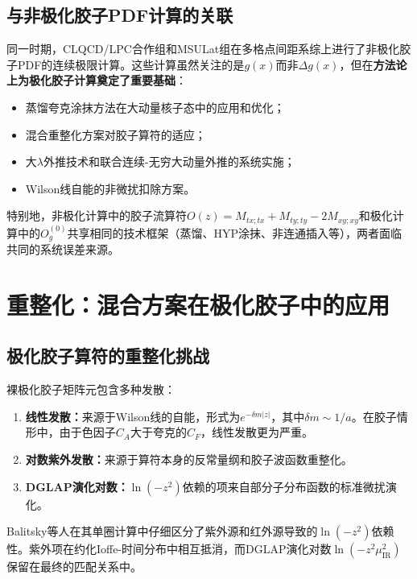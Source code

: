 \documentclass[12pt,a4paper]{ctexart}
\theoremstyle{definition}
\begin{document}
\subsection{与非极化胶子PDF计算的关联}

同一时期，CLQCD/LPC合作组\cite{Chen2025gluon}和MSULat组\cite{Lin2025gluon}在多格点间距系综上进行了非极化胶子PDF的连续极限计算。这些计算虽然关注的是$g(x)$而非$\Delta g(x)$，但在\textbf{方法论上为极化胶子计算奠定了重要基础}：

\begin{itemize}
    \item 蒸馏夸克涂抹方法在大动量核子态中的应用和优化；
    \item 混合重整化方案对胶子算符的适应；
    \item 大$\lambda$外推技术和联合连续-无穷大动量外推的系统实施；
    \item Wilson线自能的非微扰扣除方案。
\end{itemize}

特别地，非极化计算中的胶子流算符$O(z) = M_{tx;tx} + M_{ty;ty} - 2M_{xy;xy}$和极化计算中的$O^{(0)}_g$共享相同的技术框架（蒸馏、HYP涂抹、非连通插入等），两者面临共同的系统误差来源\cite{Chen2025gluon,Egerer2022}。

\section{重整化：混合方案在极化胶子中的应用}

\subsection{极化胶子算符的重整化挑战}

裸极化胶子矩阵元包含多种发散\cite{Balitsky2020,Ji2021hybrid}：

\begin{enumerate}
    \item \textbf{线性发散：}来源于Wilson线的自能，形式为$e^{-\delta m |z|}$，其中$\delta m \sim 1/a$。在胶子情形中，由于色因子$C_A$大于夸克的$C_F$，线性发散更为严重\cite{Chen2025gluon}。
    \item \textbf{对数紫外发散：}来源于算符本身的反常量纲和胶子波函数重整化。
    \item \textbf{DGLAP演化对数：}$\ln(-z^2)$依赖的项来自部分子分布函数的标准微扰演化。
\end{enumerate}

Balitsky等人\cite{Balitsky2020}在其单圈计算中仔细区分了紫外源和红外源导致的$\ln(-z^2)$依赖性。紫外项在约化Ioffe-时间分布中相互抵消，而DGLAP演化对数$\ln(-z^2\mu_{\text{IR}}^2)$保留在最终的匹配关系中。
\end{document}
